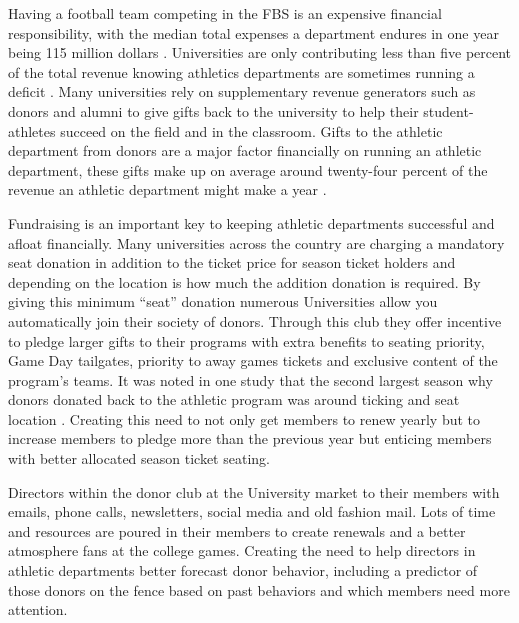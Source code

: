 \documentclass[12pt,english]{article}
\begin{document}
Having a football team competing in the FBS is an expensive financial responsibility, with the median total expenses a department endures in one year being 115 million dollars \citet{powell_2019}. Universities are only contributing less than five percent of the total revenue knowing athletics departments are sometimes running a deficit \citet{powell_2019}. Many universities rely on supplementary revenue generators such as donors and alumni to give gifts back to the university to help their student-athletes succeed on the field and in the classroom. Gifts to the athletic department from donors are a major factor financially on running an athletic department, these gifts make up on average around twenty-four percent of the revenue an athletic department might make a year \cite{powell_2019}. 

Fundraising is an important key to keeping athletic departments successful and afloat financially. Many universities across the country are charging a mandatory seat donation in addition to the ticket price for season ticket holders and depending on the location is how much the addition donation is required. By giving this minimum “seat” donation numerous Universities allow you automatically join their society of donors. Through this club they offer incentive to pledge larger gifts to their programs with extra benefits to seating priority, Game Day tailgates, priority to away games tickets and exclusive content of the program’s teams. It was noted in one study that the second largest season why donors donated back to the athletic program was around ticking and seat location \citet{gladden2005toward}. Creating this need to not only get members to renew yearly but to increase members to pledge more than the previous year but enticing members with better allocated season ticket seating.

Directors within the donor club at the University market to their members with emails, phone calls, newsletters, social media and old fashion mail. Lots of time and resources are poured in their members to create renewals and a better atmosphere fans at the college games. Creating the need to help directors in athletic departments better forecast donor behavior, including a predictor of those donors on the fence based on past behaviors and which members need more attention. 
\end{document}
